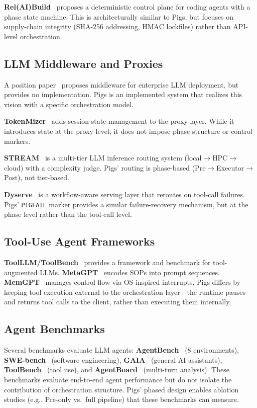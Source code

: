 \textbf{Rel(AI)Build}~\citep{relaibuild2026} proposes a deterministic control plane for coding agents with a phase state machine. This is architecturally similar to Pigs, but focuses on supply-chain integrity (SHA-256 addressing, HMAC lockfiles) rather than API-level orchestration.

\subsection{LLM Middleware and Proxies}

A position paper~\citep{dzanic2024middleware} proposes middleware for enterprise LLM deployment, but provides no implementation. Pigs is an implemented system that realizes this vision with a specific orchestration model.

\textbf{TokenMizer}~\citep{liu2026tokenmizer} adds session state management to the proxy layer. While it introduces state at the proxy level, it does not impose phase structure or control markers.

\textbf{STREAM}~\citep{stream2026} is a multi-tier LLM inference routing system (local$\rightarrow$HPC$\rightarrow$cloud) with a complexity judge. Pigs' routing is phase-based (Pre$\rightarrow$Executor$\rightarrow$Post), not tier-based.

\textbf{Dyserve}~\citep{dyserve2027} is a workflow-aware serving layer that reroutes on tool-call failures. Pigs' \texttt{PIGFAIL} marker provides a similar failure-recovery mechanism, but at the phase level rather than the tool-call level.

\subsection{Tool-Use Agent Frameworks}

\textbf{ToolLLM/ToolBench}~\citep{qin2023toolllm} provides a framework and benchmark for tool-augmented LLMs. \textbf{MetaGPT}~\citep{hong2023metagpt} encodes SOPs into prompt sequences. \textbf{MemGPT}~\citep{packer2023memgpt} manages control flow via OS-inspired interrupts. Pigs differs by keeping tool execution external to the orchestration layer---the runtime pauses and returns tool calls to the client, rather than executing them internally.

\subsection{Agent Benchmarks}

Several benchmarks evaluate LLM agents: \textbf{AgentBench}~\citep{liu2023agentbench} (8 environments), \textbf{SWE-bench}~\citep{jimenez2024swebench} (software engineering), \textbf{GAIA}~\citep{mialon2023gaia} (general AI assistants), \textbf{ToolBench}~\citep{qin2023toolllm} (tool use), and \textbf{AgentBoard}~\citep{ma2024agentboard} (multi-turn analysis). These benchmarks evaluate end-to-end agent performance but do not isolate the contribution of orchestration structure. Pigs' phased design enables ablation studies (e.g., Pre-only vs.\ full pipeline) that these benchmarks can measure.

